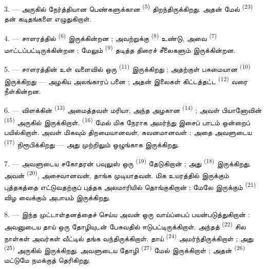 3. --- அருகில் நேர்த்தியான பெண்களுக்கான 
\textsuperscript{(5)} திறந்திருக்கிறது. அதன் மேல் 
\textsuperscript{(23)} தன் கடிதங்களை எழுதுகிறாள்.

4. --- சாளரத்தில்  \textsuperscript{(6)}
இருக்கின்றன ; அவற்றுக்கு  \textsuperscript{(8)}
உண்டு, அவை  \textsuperscript{(7)}
மாட்டப்பட்டிருக்கின்றன ; மேலும் 
\textsuperscript{(9)} தடித்த திரைச் சீலைகளும் இருக்கின்றன.

5. --- சாளரத்தின் உள் வளைவில் ஒரு 
\textsuperscript{(11)} இருக்கிறது ; அதற்குள் பசுமையான 
\textsuperscript{(10)} இருக்கிறது — அழகிய அலங்காரப் பனை ; அதன் இலைகள்
கிட்டத்தட்ட  \textsuperscript{(12)} வரை
நீள்கின்றன.

6. --- விளக்கின்  \textsuperscript{(13)}
அமைத்தவள் மரியா, அந்த அழகான  \textsuperscript{(14)} ;
அவள் பியானோவின் \textsuperscript{(15)} அருகில் இருக்கிறாள்.
 \textsuperscript{(16)} மேல் மிக நேராக அமர்ந்து
இசைப் பாடம் ஒன்றைப் பயில்கிறாள். அவள் மிகவும் திறமையானவள்,
கவனமானவள் ; அதை அவளுடைய  \textsuperscript{(17)}
நிரூபிக்கிறது — அது முற்றிலும் ஒழுங்காக இருக்கிறது.

\VUsaut{5.0mm}
\VUsaut{3.0mm}

7. --- அவளுடைய சகோதரன் பவுலுஸ் ஒரு 
\textsuperscript{(19)} தேடுகிறான் ; அது 
\textsuperscript{(18)} இருக்கிறது. அவன் 
\textsuperscript{(20)}, அசைவானவன், தாங்க முடியாதவன். மிக உயரத்தில்
இருக்கும் புத்தகத்தை எட்டுவதற்குப் புத்தக அலமாரியில் தொங்குகிறான் ;
மேலே இருக்கும்  \textsuperscript{(21)} விழ
வைக்கும் அபாயம் இருக்கிறது.

8. --- இந்த முட்டாள்தனத்தைச் செய்ய அவன் ஒரு வாய்ப்பைப்
பயன்படுத்துகிறான் : அவனுடைய தாய் ஒரு தோழியுடன் பேசுவதில்
ஈடுபட்டிருக்கிறாள். அந்தத்  \textsuperscript{(22)} சில
நாள்கள் அவர்கள் வீட்டில் தங்க வந்திருக்கிறாள். தாய்  \textsuperscript{(24)} அமர்ந்திருக்கிறாள் ; அது
 \textsuperscript{(25)} அருகில் இருக்கிறது.
அவளுடைய தோழி  \textsuperscript{(27)} மேல்
இருக்கிறாள் ; அதன்  \textsuperscript{(26)}
மட்டுமே நமக்குத் தெரிகிறது.

